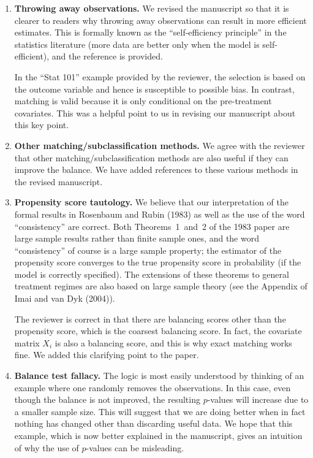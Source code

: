 \documentclass[11pt]{article}
\begin{document}
\begin{enumerate}
\item {\bf Throwing away observations.} We revised the manuscript so
  that it is clearer to readers why throwing away observations can
  result in more efficient estimates. This is formally known as the
  ``self-efficiency principle'' in the statistics literature (more
  data are better only when the model is self-efficient), and the
  reference is provided.
  
  In the ``Stat 101'' example provided by the reviewer, the selection
  is based on the outcome variable and hence is susceptible to
  possible bias. In contrast, matching is valid because it is only
  conditional on the pre-treatment covariates.  This was a helpful
  point to us in revising our manuscript about this key point.

\item {\bf Other matching/subclassification methods.} We agree with
  the reviewer that other matching/subclassification methods are also
  useful if they can improve the balance. We have added references to
  these various methods in the revised manuscript.
  
\item {\bf Propensity score tautology.} We believe that our
  interpretation of the formal results in Rosenbaum and Rubin (1983)
  as well as the use of the word ``consistency'' are correct. Both
  Theorems~1~and~2 of the 1983 paper are large sample results rather
  than finite sample ones, and the word ``consistency'' of course is a
  large sample property; the estimator of the propensity score
  converges to the true propensity score in probability (if the model
  is correctly specified).  The extensions of these theorems to
  general treatment regimes are also based on large sample theory (see
  the Appendix of Imai and van Dyk (2004)).
  
  The reviewer is correct in that there are balancing scores other
  than the propensity score, which is the coarsest balancing score. In
  fact, the covariate matrix $X_i$ is also a balancing score, and this
  is why exact matching works fine.  We added this clarifying point to
  the paper.
  
\item {\bf Balance test fallacy.} The logic is most easily understood
  by thinking of an example where one randomly removes the
  observations. In this case, even though the balance is not improved,
  the resulting $p$-values will increase due to a smaller sample size.
  This will suggest that we are doing better when in fact nothing has
  changed other than discarding useful data.  We hope that this
  example, which is now better explained in the manuscript, gives an
  intuition of why the use of $p$-values can be misleading.

\end{enumerate}
\end{document}
